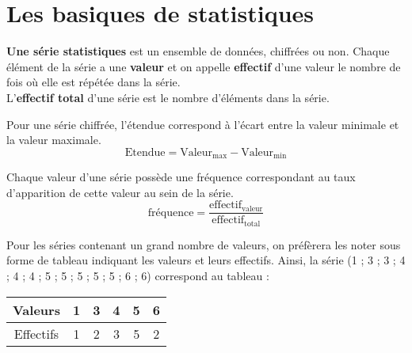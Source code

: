 \section{Les basiques de statistiques}

{\textbf{Une série statistiques} est un ensemble de données, chiffrées ou non.
Chaque élément de la série a une \textbf{valeur} et on appelle \textbf{effectif} d'une valeur le nombre de fois où elle est répétée dans la série.\\
L'\textbf{effectif total} d'une série est le nombre d'éléments dans la série.}


{Pour une série chiffrée, l'étendue correspond à l'écart entre la valeur minimale et la valeur maximale. $$\text{Etendue}=\text{Valeur}_{\text{max}}-\text{Valeur}_{\text{min}}$$}


{Chaque valeur d'une série possède une fréquence correspondant au taux d'apparition de cette valeur au sein de la série. $$\text{fréquence}=\dfrac{\text{effectif}_{\text{valeur}}}{\text{effectif}_{\text{total}}}$$}



Pour les séries contenant un grand nombre de valeurs, on préfèrera les noter sous forme de tableau indiquant les valeurs et leurs effectifs. Ainsi,  la série (1 ; 3 ; 3 ; 4 ; 4 ; 4 ; 5 ; 5 ; 5 ; 5 ; 5 ; 6 ; 6) correspond au tableau :
\begin{center}
    \begin{tabular}{c*{5}{|c}}
        Valeurs & 1 & 3 & 4 &5 & 6 \\ \hline
        Effectifs & 1 & 2 & 3 & 5 & 2
    \end{tabular}
\end{center}


